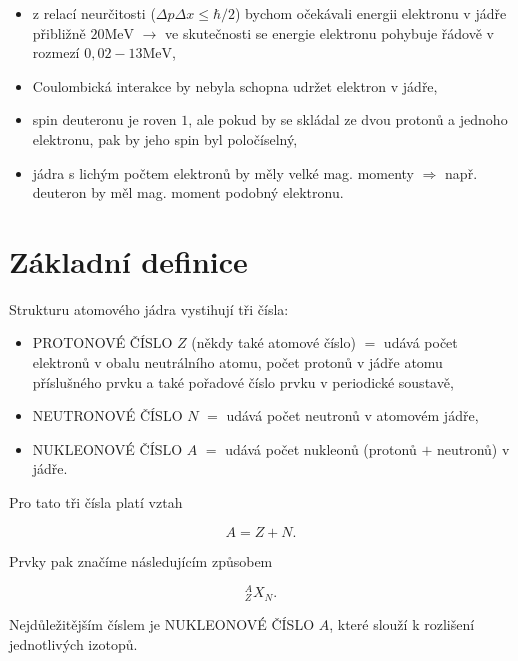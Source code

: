 \documentclass[../../main.tex]{subfiles}
\begin{document}
\begin{itemize}
	\item z relací neurčitosti ($\Delta p \Delta x \leq \hbar /2$) bychom očekávali energii elektronu v jádře přibližně $20 \mathrm{MeV}$ $\rightarrow$ ve skutečnosti se energie elektronu pohybuje řádově v rozmezí $0,02 - 13 \mathrm{MeV}$,
	\item Coulombická interakce by nebyla schopna udržet elektron v jádře,
	\item spin deuteronu je roven $1$, ale pokud by se skládal ze dvou protonů a jednoho elektronu, pak by jeho spin byl poločíselný,
	\item jádra s lichým počtem elektronů by měly velké mag. momenty $\Rightarrow$ např. deuteron by měl mag. moment podobný elektronu.
\end{itemize}

\section{Základní definice}

Strukturu atomového jádra vystihují tři čísla:

\begin{itemize}
	\item PROTONOVÉ ČÍSLO $Z$ (někdy také atomové číslo) $=$ udává počet elektronů v obalu neutrálního atomu, počet protonů v jádře atomu příslušného prvku a také pořadové číslo prvku v periodické soustavě,
	\item NEUTRONOVÉ ČÍSLO $N$ $=$ udává počet neutronů v atomovém jádře,
	\item NUKLEONOVÉ ČÍSLO $A$ $=$ udává počet nukleonů (protonů $+$ neutronů) v jádře.
\end{itemize}

Pro tato tři čísla platí vztah

\begin{equation}
A = Z + N.
\end{equation}

Prvky pak značíme následujícím způsobem

\begin{equation}
^{A}_{Z}X_N.
\end{equation}

Nejdůležitějším číslem je NUKLEONOVÉ ČÍSLO $A$, které slouží k rozlišení jednotlivých izotopů.
\end{document}
